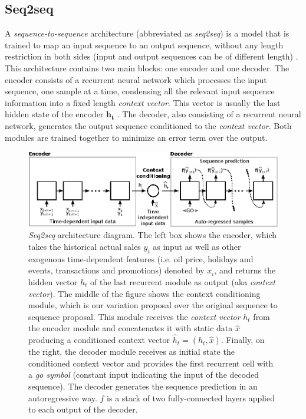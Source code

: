 \documentclass{elsarticle}
\begin{document}
	\subsection{Seq2seq}  %
	A \textit{sequence-to-sequence} architecture (abbreviated as \textit{seq2seq}) is a model that is trained to map an input sequence to an output sequence, without any length restriction in both sides (input and output sequences can be of different length) \cite{sutskever2014}. This architecture contains two main blocks: one encoder and one decoder. The encoder consists of a recurrent neural network which processes the input sequence, one sample at a time, condensing all the relevant input sequence information into a fixed length \textit{context vector}. This vector is usually the last hidden state of the encoder $\mathbf{h_t}$ \cite{kamath2019}. The decoder, also consisting of a recurrent neural network, generates the output sequence conditioned to the \textit{context vector}. Both modules are trained together to minimize an error term over the output.
	 
	\begin{figure}[h!]
		\centering
		\includegraphics[width=1\linewidth]{img/s2s}
		\caption{\textit{Seq2seq} architecture diagram. The left box shows the encoder, which takes the historical actual sales $y_i$ as input as well as other exogenous time-dependent features (i.e. oil price, holidays and events, transactions and promotions) denoted by $x_i$, and returns the hidden vector $h_t$ of the last recurrent module as output (aka \textit{context vector}). The middle of the figure shows the context conditioning module, which is our variation proposal over the original sequence to sequence proposal. This module receives the \textit{context vector} $h_t$ from the encoder module and concatenates it with static data $\hat{x}$ producing a conditioned context vector $\hat{h}_t = (h_t, \hat{x})$. Finally, on the right, the decoder module receives as initial state the conditioned context vector and provides the first recurrent cell with a \textit{go symbol} (constant input indicating the input of the decoded sequence). The decoder generates the sequence prediction in an autoregressive way. $f$ is a stack of two fully-connected layers applied to each output of the decoder.}
		\label{fig:s2s}
	\end{figure}
	
\end{document}
